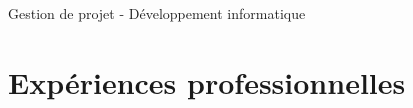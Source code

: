 \documentclass[12pt,a4paper]{twentysecondcv} %
\begin{document}

\makeprofile %



{\Large Gestion de projet - Développement informatique} %



\section{Exp\'eriences professionnelles}
\end{document}
